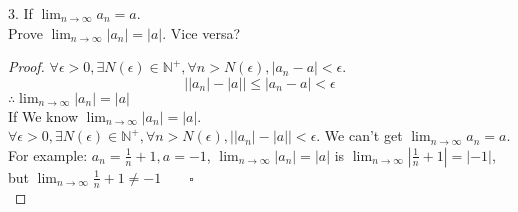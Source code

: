 \begin{qs}
3. If $ \lim_{n\rightarrow\infty} a_n = a $.\\ Prove $ \lim_{n\rightarrow\infty} |a_n| = |a| $. Vice versa?\\

\end{qs}
\begin{proof}
$ \forall \epsilon>0, \exists N(\epsilon) \in \mathbb{N}^+, \forall n>N(\epsilon), |a_n - a| <\epsilon$. 
\begin{equation*}
	\Big| |a_n| - |a| \Big| \leqslant|a_n - a| <\epsilon
\end{equation*}
$ \therefore \lim_{n\rightarrow\infty} |a_n| = |a| $\\
If We know $ \lim_{n\rightarrow\infty} |a_n| = |a| $.\\
$ \forall \epsilon>0, \exists N(\epsilon) \in \mathbb{N}^+, \forall n>N(\epsilon), \big||a_n| - |a|\big| <\epsilon$.  We can't get $ \lim_{n\rightarrow\infty} a_n = a $. For example: $ a_n = \frac{1}{n}+1, a = -1 $, $ \lim_{n\rightarrow\infty} |a_n| = |a| $ is $ \lim_{n\rightarrow\infty} |\frac{1}{n}+1| = |-1| $, but $ \lim_{n\rightarrow\infty} \frac{1}{n}+1 \neq -1 \qquad\square $\\
\end{proof}

